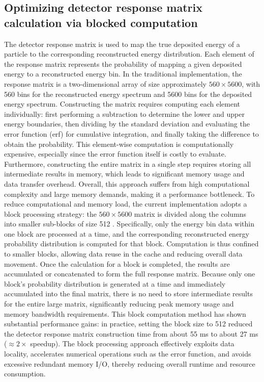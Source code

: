 \documentclass[xetex,twocolumn,epjc3]{svjour3}
\begin{document}
\subsection{Optimizing detector response matrix calculation via blocked computation}
The detector response matrix is used to map the true deposited energy of a particle to the corresponding reconstructed energy distribution. Each element of the response matrix represents the probability of mapping a given deposited energy to a reconstructed energy bin. In the traditional implementation, the response matrix is a two-dimensional array of size approximately $560 \times 5600$, with 560 bins for the reconstructed energy spectrum and 5600 bins for the deposited energy spectrum. Constructing the matrix requires computing each element individually: first performing a subtraction to determine the lower and upper energy boundaries, then dividing by the standard deviation and evaluating the error function (erf) for cumulative integration, and finally taking the difference to obtain the probability. This element-wise computation is computationally expensive, especially since the error function itself is costly to evaluate. Furthermore, constructing the entire matrix in a single step requires storing all intermediate results in memory, which leads to significant memory usage and data transfer overhead. Overall, this approach suffers from high computational complexity and large memory demands, making it a performance bottleneck. To reduce computational and memory load, the current implementation adopts a block processing strategy: the $560 \times 5600$ matrix is divided along the columns into smaller sub-blocks of size 512 \cite{Lam1991}. Specifically, only the energy bin data within one block are processed at a time, and the corresponding reconstructed energy probability distribution is computed for that block. Computation is thus confined to smaller blocks, allowing data reuse in the cache and reducing overall data movement. Once the calculation for a block is completed, the results are accumulated or concatenated to form the full response matrix. Because only one block’s probability distribution is generated at a time and immediately accumulated into the final matrix, there is no need to store intermediate results for the entire large matrix, significantly reducing peak memory usage and memory bandwidth requirements. This block computation method has shown substantial performance gains: in practice, setting the block size to 512 reduced the detector response matrix construction time from about 55 ms to about 27 ms ($\approx 2\times$ speedup). The block processing approach effectively exploits data locality, accelerates numerical operations such as the error function, and avoids excessive redundant memory I/O, thereby reducing overall runtime and resource consumption.
\end{document}
